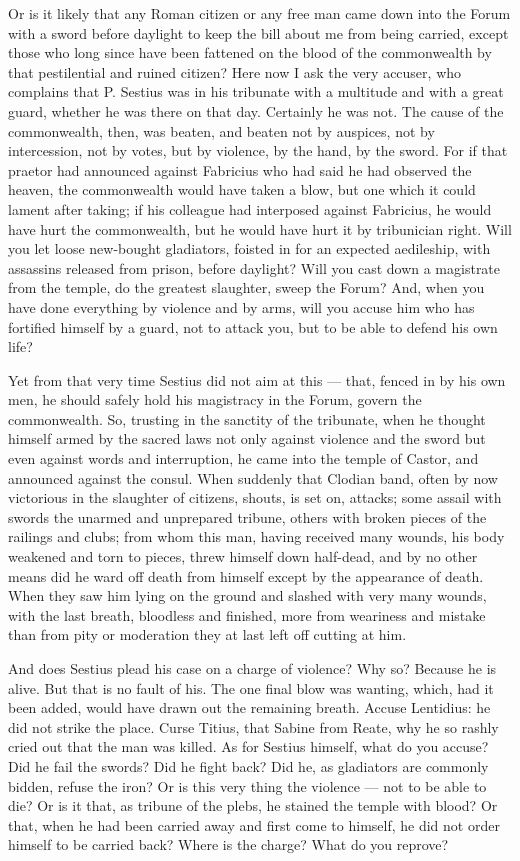  Or is it likely that any Roman citizen or any free man came down into the Forum with a sword before daylight to keep the bill about me from being carried, except those who long since have been fattened on the blood of the commonwealth by that pestilential and ruined citizen? Here now I ask the very accuser, who complains that P. Sestius was in his tribunate with a multitude and with a great guard, whether he was there on that day. Certainly he was not. The cause of the commonwealth, then, was beaten, and beaten not by auspices, not by intercession, not by votes, but by violence, by the hand, by the sword. For if that praetor had announced against Fabricius who had said he had observed the heaven, the commonwealth would have taken a blow, but one which it could lament after taking; if his colleague had interposed against Fabricius, he would have hurt the commonwealth, but he would have hurt it by tribunician right. Will you let loose new-bought gladiators, foisted in for an expected aedileship, with assassins released from prison, before daylight? Will you cast down a magistrate from the temple, do the greatest slaughter, sweep the Forum? And, when you have done everything by violence and by arms, will you accuse him who has fortified himself by a guard, not to attack you, but to be able to defend his own life?

 Yet from that very time Sestius did not aim at this --- that, fenced in by his own men, he should safely hold his magistracy in the Forum, govern the commonwealth. So, trusting in the sanctity of the tribunate, when he thought himself armed by the sacred laws not only against violence and the sword but even against words and interruption, he came into the temple of Castor, and announced against the consul. When suddenly that Clodian band, often by now victorious in the slaughter of citizens, shouts, is set on, attacks; some assail with swords the unarmed and unprepared tribune, others with broken pieces of the railings and clubs; from whom this man, having received many wounds, his body weakened and torn to pieces, threw himself down half-dead, and by no other means did he ward off death from himself except by the appearance of death. When they saw him lying on the ground and slashed with very many wounds, with the last breath, bloodless and finished, more from weariness and mistake than from pity or moderation they at last left off cutting at him.

 And does Sestius plead his case on a charge of violence? Why so? Because he is alive. But that is no fault of his. The one final blow was wanting, which, had it been added, would have drawn out the remaining breath. Accuse Lentidius: he did not strike the place. Curse Titius, that Sabine from Reate, why he so rashly cried out that the man was killed. As for Sestius himself, what do you accuse? Did he fail the swords? Did he fight back? Did he, as gladiators are commonly bidden, refuse the iron? Or is this very thing the violence --- not to be able to die? Or is it that, as tribune of the plebs, he stained the temple with blood? Or that, when he had been carried away and first come to himself, he did not order himself to be carried back? Where is the charge? What do you reprove?

